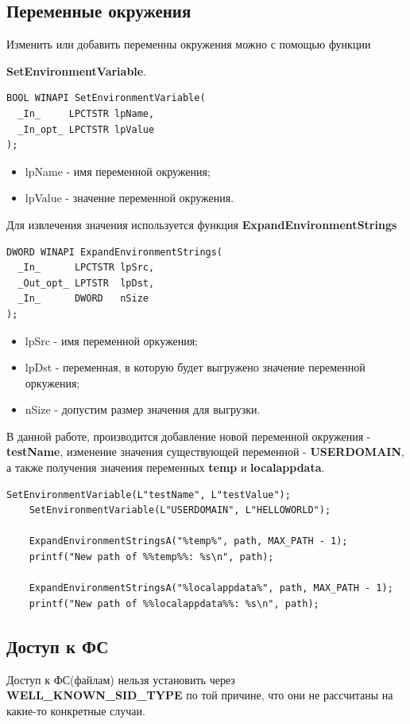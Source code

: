 \subsection{Переменные окружения}
Изменить или добавить переменны окружения можно с помощью функции

\textbf{SetEnvironmentVariable}\cite{SetEnvironmentVariable}.
\begin{lstlisting}[language={}, caption={Прототип SetEnvironmentVariable}]
BOOL WINAPI SetEnvironmentVariable(
  _In_     LPCTSTR lpName,
  _In_opt_ LPCTSTR lpValue
);
\end{lstlisting}
\begin{itemize}
\item lpName - имя переменной окружения;
\item lpValue - значение переменной окружения.
\end{itemize}
Для извлечения значения используется функция \textbf{ExpandEnvironmentStrings}\cite{ExpandEnvironmentStrings}
\begin{lstlisting}[language={}, caption={Прототип ExpandEnvironmentStrings}]
DWORD WINAPI ExpandEnvironmentStrings(
  _In_      LPCTSTR lpSrc,
  _Out_opt_ LPTSTR  lpDst,
  _In_      DWORD   nSize
);
\end{lstlisting}
\begin{itemize}
\item lpSrc - имя переменной оркужения;
\item lpDst - переменная, в которую будет выгружено значение переменной оркужения;
\item nSize - допустим размер значения для выгрузки.
\end{itemize}
В данной работе, производится добавление новой переменной окружения - \textbf{testName}, изменение значения существующей переменной - \textbf{USERDOMAIN}, а также получения значения переменных \textbf{temp} и \textbf{localappdata}.
\begin{lstlisting}[language={}, caption={Фрагмент кода по работе с переменными окружения}]
	SetEnvironmentVariable(L"testName", L"testValue");
	SetEnvironmentVariable(L"USERDOMAIN", L"HELLOWORLD");

	ExpandEnvironmentStringsA("%temp%", path, MAX_PATH - 1);
	printf("New path of %%temp%%: %s\n", path);

	ExpandEnvironmentStringsA("%localappdata%", path, MAX_PATH - 1);
	printf("New path of %%localappdata%%: %s\n", path);
\end{lstlisting}

\subsection{Доступ к ФС}
Доступ к ФС(файлам) нельзя установить через \textbf{WELL\_KNOWN\_SID\_TYPE} по той причине, что они не рассчитаны на какие-то конкретные случаи.


